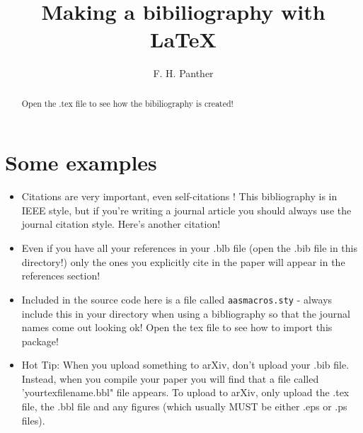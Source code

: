 \documentclass[]{article}
\title{Making a bibiliography with LaTeX}
\author{F. H. Panther}
\begin{document}
\maketitle

\begin{abstract}
Open the .tex file to see how the bibiliography is created!
\end{abstract}

\section{Some examples}
\begin{itemize}
	\item Citations are very important, even self-citations \cite{Panther2018b}! This bibliography is in IEEE style, but if you're writing a journal article you should always use the journal citation style. Here's another citation! \cite{Siegert16}
	\item Even if you have all your references in your .blb file (open the .bib file in this directory!) only the ones you explicitly cite in the paper will appear in the references section!
	\item Included in the source code here is a file called \texttt{aasmacros.sty} - always include this in your directory when using a bibliography so that the journal names come out looking ok! Open the tex file to see how to import this package!
	\item Hot Tip: When you upload something to arXiv, don't upload your .bib file. Instead, when you compile your paper you will find that a file called 'yourtexfilename.bbl" file appears. To upload to arXiv, only upload the .tex file, the .bbl file and any figures (which usually MUST be either .eps or .ps files).  
\end{itemize}




\end{document}
